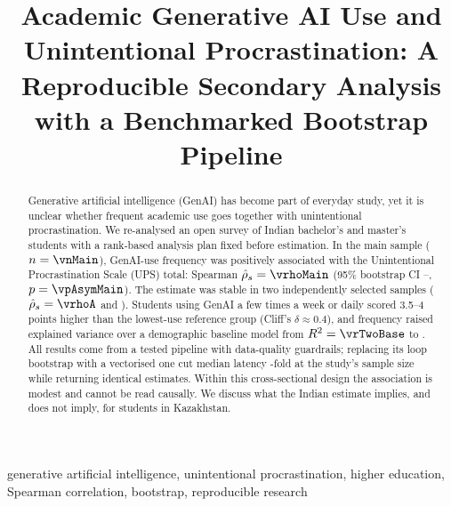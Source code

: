 \documentclass[conference]{IEEEtran}
\begin{document}
\title{Academic Generative AI Use and Unintentional Procrastination: A Reproducible Secondary Analysis with a Benchmarked Bootstrap Pipeline}

\author{
\and
{}
}

\maketitle

\begin{abstract}
Generative artificial intelligence (GenAI) has become part of everyday study, yet it is unclear whether frequent academic use goes together with unintentional procrastination. We re-analysed an open survey of Indian bachelor's and master's students with a rank-based analysis plan fixed before estimation. In the main sample ($n=\vnMain$), GenAI-use frequency was positively associated with the Unintentional Procrastination Scale (UPS) total: Spearman $\hat\rho_s=\vrhoMain$ (95\% bootstrap CI \vrhoMainLo--\vrhoMainHi, $p=\vpAsymMain$). The estimate was stable in two independently selected samples ($\hat\rho_s=\vrhoA$ and \vrhoB). Students using GenAI a few times a week or daily scored 3.5--4 points higher than the lowest-use reference group (Cliff's $\delta\approx0.4$), and frequency raised explained variance over a demographic baseline model from $R^2=\vrTwoBase$ to \vrTwoProp. All results come from a tested pipeline with data-quality guardrails; replacing its loop bootstrap with a vectorised one cut median latency \vspeedTwoEightFive-fold at the study's sample size while returning identical estimates. Within this cross-sectional design the association is modest and cannot be read causally. We discuss what the Indian estimate implies, and does not imply, for students in Kazakhstan.
\end{abstract}

\begin{IEEEkeywords}
generative artificial intelligence, unintentional procrastination, higher education, Spearman correlation, bootstrap, reproducible research
\end{IEEEkeywords}








\end{document}
